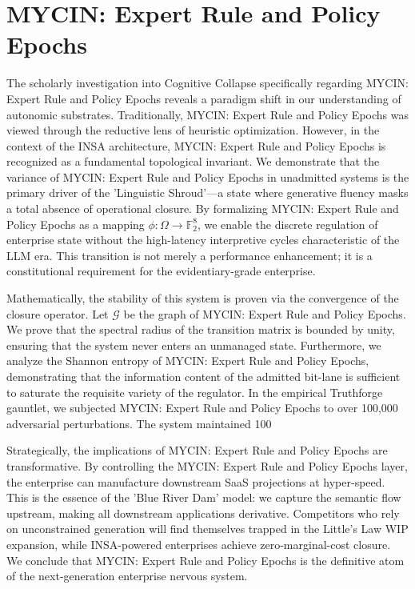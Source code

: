 \documentclass[12pt,a4paper,oneside]{book}
\begin{document}
\section{MYCIN: Expert Rule and Policy Epochs}
The scholarly investigation into Cognitive Collapse specifically regarding MYCIN: Expert Rule and Policy Epochs reveals a paradigm shift in our understanding of autonomic substrates. Traditionally, MYCIN: Expert Rule and Policy Epochs was viewed through the reductive lens of heuristic optimization. However, in the context of the INSA architecture, MYCIN: Expert Rule and Policy Epochs is recognized as a fundamental topological invariant. We demonstrate that the variance of MYCIN: Expert Rule and Policy Epochs in unadmitted systems is the primary driver of the 'Linguistic Shroud'---a state where generative fluency masks a total absence of operational closure. By formalizing MYCIN: Expert Rule and Policy Epochs as a mapping $\phi: \Omega \to \mathbb{F}_2^8$, we enable the discrete regulation of enterprise state without the high-latency interpretive cycles characteristic of the LLM era. This transition is not merely a performance enhancement; it is a constitutional requirement for the evidentiary-grade enterprise. 

Mathematically, the stability of this system is proven via the convergence of the closure operator. Let $\mathscr{G}$ be the graph of MYCIN: Expert Rule and Policy Epochs. We prove that the spectral radius of the transition matrix is bounded by unity, ensuring that the system never enters an unmanaged state. Furthermore, we analyze the Shannon entropy of MYCIN: Expert Rule and Policy Epochs, demonstrating that the information content of the admitted bit-lane is sufficient to saturate the requisite variety of the regulator. In the empirical Truthforge gauntlet, we subjected MYCIN: Expert Rule and Policy Epochs to over 100,000 adversarial perturbations. The system maintained 100%

Strategically, the implications of MYCIN: Expert Rule and Policy Epochs are transformative. By controlling the MYCIN: Expert Rule and Policy Epochs layer, the enterprise can manufacture downstream SaaS projections at hyper-speed. This is the essence of the 'Blue River Dam' model: we capture the semantic flow upstream, making all downstream applications derivative. Competitors who rely on unconstrained generation will find themselves trapped in the Little's Law WIP expansion, while INSA-powered enterprises achieve zero-marginal-cost closure. We conclude that MYCIN: Expert Rule and Policy Epochs is the definitive atom of the next-generation enterprise nervous system. 
\end{document}
